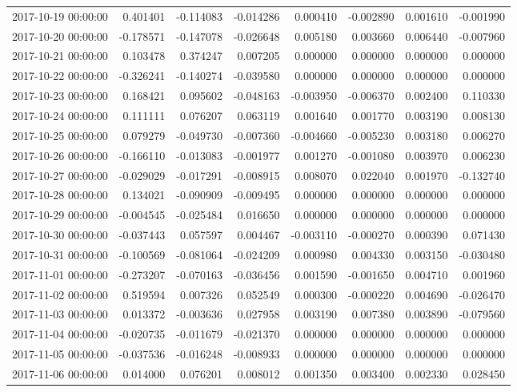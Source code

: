 \begin{tabular}{lrrrrrrr}
2017-10-19 00:00:00 & 0.401401 & -0.114083 & -0.014286 & 0.000410 & -0.002890 & 0.001610 & -0.001990 \\
2017-10-20 00:00:00 & -0.178571 & -0.147078 & -0.026648 & 0.005180 & 0.003660 & 0.006440 & -0.007960 \\
2017-10-21 00:00:00 & 0.103478 & 0.374247 & 0.007205 & 0.000000 & 0.000000 & 0.000000 & 0.000000 \\
2017-10-22 00:00:00 & -0.326241 & -0.140274 & -0.039580 & 0.000000 & 0.000000 & 0.000000 & 0.000000 \\
2017-10-23 00:00:00 & 0.168421 & 0.095602 & -0.048163 & -0.003950 & -0.006370 & 0.002400 & 0.110330 \\
2017-10-24 00:00:00 & 0.111111 & 0.076207 & 0.063119 & 0.001640 & 0.001770 & 0.003190 & 0.008130 \\
2017-10-25 00:00:00 & 0.079279 & -0.049730 & -0.007360 & -0.004660 & -0.005230 & 0.003180 & 0.006270 \\
2017-10-26 00:00:00 & -0.166110 & -0.013083 & -0.001977 & 0.001270 & -0.001080 & 0.003970 & 0.006230 \\
2017-10-27 00:00:00 & -0.029029 & -0.017291 & -0.008915 & 0.008070 & 0.022040 & 0.001970 & -0.132740 \\
2017-10-28 00:00:00 & 0.134021 & -0.090909 & -0.009495 & 0.000000 & 0.000000 & 0.000000 & 0.000000 \\
2017-10-29 00:00:00 & -0.004545 & -0.025484 & 0.016650 & 0.000000 & 0.000000 & 0.000000 & 0.000000 \\
2017-10-30 00:00:00 & -0.037443 & 0.057597 & 0.004467 & -0.003110 & -0.000270 & 0.000390 & 0.071430 \\
2017-10-31 00:00:00 & -0.100569 & -0.081064 & -0.024209 & 0.000980 & 0.004330 & 0.003150 & -0.030480 \\
2017-11-01 00:00:00 & -0.273207 & -0.070163 & -0.036456 & 0.001590 & -0.001650 & 0.004710 & 0.001960 \\
2017-11-02 00:00:00 & 0.519594 & 0.007326 & 0.052549 & 0.000300 & -0.000220 & 0.004690 & -0.026470 \\
2017-11-03 00:00:00 & 0.013372 & -0.003636 & 0.027958 & 0.003190 & 0.007380 & 0.003890 & -0.079560 \\
2017-11-04 00:00:00 & -0.020735 & -0.011679 & -0.021370 & 0.000000 & 0.000000 & 0.000000 & 0.000000 \\
2017-11-05 00:00:00 & -0.037536 & -0.016248 & -0.008933 & 0.000000 & 0.000000 & 0.000000 & 0.000000 \\
2017-11-06 00:00:00 & 0.014000 & 0.076201 & 0.008012 & 0.001350 & 0.003400 & 0.002330 & 0.028450 \\

\end{tabular}
